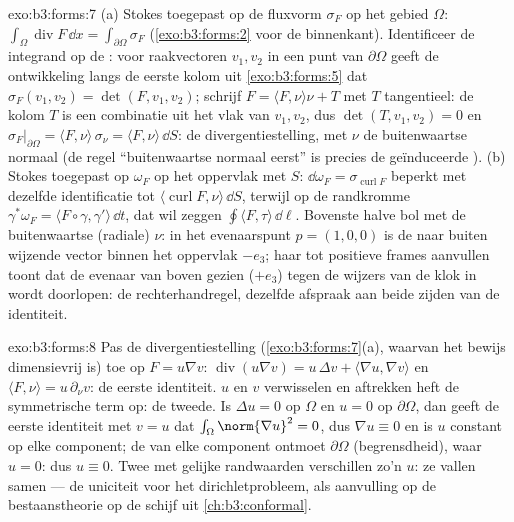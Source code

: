 \begin{solution}{exo:b3:forms:7}
(a) Stokes toegepast op de fluxvorm $\sigma_F$ op het 
gebied $\Omega$: $\int_\Omega\operatorname{div}F\,\dd x =
\int_{\partial\Omega}\sigma_F$ (\cref{exo:b3:forms:2} voor de
binnenkant). Identificeer de integrand op de : voor
raakvectoren $v_1, v_2$ in een punt van $\partial\Omega$ geeft de
ontwikkeling langs de eerste kolom uit \cref{exo:b3:forms:5} dat
$\sigma_F(v_1, v_2) = \det(F, v_1, v_2)$; schrijf $F = \langle F,
\nu\rangle\nu + T$ met $T$ tangentieel: de kolom $T$ is een
combinatie uit het vlak van $v_1, v_2$, dus $\det(T, v_1, v_2) =
0$ en $\sigma_F\vert_{\partial\Omega} = \langle F,
\nu\rangle\,\sigma_\nu = \langle F, \nu\rangle\,\dd S$: de
divergentiestelling, met $\nu$ de buitenwaartse normaal (de regel
``buitenwaartse normaal eerst'' is precies de geïnduceerde
).
(b) Stokes toegepast op $\omega_F$ op het oppervlak met  $S$:
$\dd\omega_F = \sigma_{\operatorname{curl}F}$ beperkt met
dezelfde identificatie tot $\langle\operatorname{curl}F,
\nu\rangle\,\dd S$, terwijl op de randkromme $\gamma^*\omega_F =
\langle F\circ\gamma, \gamma'\rangle\,\dd t$, dat wil zeggen
$\oint\langle F, \tau\rangle\,\dd\ell$. Bovenste halve bol met de
buitenwaartse (radiale) $\nu$: in het evenaarspunt $p = (1,0,0)$
is de naar buiten wijzende vector binnen het oppervlak $-e_3$;
haar tot positieve frames aanvullen toont dat de evenaar van
boven gezien ($+e_3$) tegen de wijzers van de klok in wordt
doorlopen: de rechterhandregel, dezelfde afspraak aan beide
zijden van de identiteit.
\end{solution}

\begin{solution}{exo:b3:forms:8}
Pas de divergentiestelling (\cref{exo:b3:forms:7}(a), waarvan het
bewijs dimensievrij is) toe op $F = u\nabla v$:
$\operatorname{div}(u\nabla v) = u\,\Delta v + \langle\nabla u,
\nabla v\rangle$ en $\langle F, \nu\rangle = u\,\partial_\nu v$:
de eerste identiteit. $u$ en $v$ verwisselen en aftrekken heft de
symmetrische term op: de tweede. Is $\Delta u = 0$ op $\Omega$ en
$u = 0$ op $\partial\Omega$, dan geeft de eerste identiteit met
$v = u$ dat $\int_\Omega\norm{\nabla u}^2 = 0$, dus $\nabla u
\equiv 0$ en is $u$ constant op elke component; de  van
elke component ontmoet $\partial\Omega$ (begrensdheid), waar $u =
0$: dus $u \equiv 0$. Twee  met gelijke
randwaarden verschillen zo'n $u$: ze vallen samen --- de
uniciteit voor het dirichletprobleem, als aanvulling op de
bestaanstheorie op de schijf uit \cref{ch:b3:conformal}.
\end{solution}

